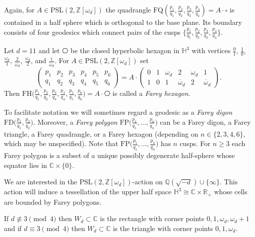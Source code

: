 \documentclass[graybox]{svmult}
\newcommand\FD{\mathrm{FD}}
\newcommand\FQ{\mathrm{FQ}}
\newcommand\FH{\mathrm{FH}}
\newcommand\FP{\mathrm{FP}}
\begin{document}
Again, for $A \in \mathrm{PSL}(2, \mathbb{Z}[\omega_d])$ the quadrangle $\FQ(\frac{p_1}{q_1},\frac{p_2}{q_2},\frac{p_3}{q_3},\frac{p_4}{q_4})=A\cdot \square$ is contained in a half sphere which is orthogonal to the base plane. Its boundary consists of four geodesics which connect pairs of the cusps $\big\{\frac{p_1}{q_1},\frac{p_2}{q_2},\frac{p_3}{q_3},\frac{p_4}{q_4}\big\}$. 

\begin{definition}
Let $d=11$ and let $\hexagon$ be the closed hyperbolic hexagon in $\mathbb{H}^3$ with vertices $\frac01$, $\frac10$, $\frac{\omega_d}1$,  $\frac2{\overline{\omega}_d}$, $\frac{\omega_d}2$,  and $\frac1{\overline{\omega}_d}$. For $A \in \mathrm{PSL}(2,\mathbb{Z}[\omega_d])$ set 
\[
\begin{pmatrix} p_1&p_2 & p_3&p_4&p_5&p_6 \\ q_1&q_2&q_3&q_4&q_5&q_6 \end{pmatrix}=A \cdot \begin{pmatrix} 0&1&\omega_d&2&\omega_d&1 \\ 1&0&1&\overline{\omega}_d&2&\overline{\omega}_d\end{pmatrix}.
\]
Then $\FH\big(\frac{p_1}{q_1},\frac{p_2}{q_2},\frac{p_3}{q_3},\frac{p_4}{q_4},\frac{p_5}{q_5},\frac{p_6}{q_6}\big)=A\cdot \hexagon$ is called a \emph{Farey hexagon}.
\end{definition}

To facilitate notation we will sometimes regard a geodesic as a {\em Farey digon} $\FD\big(\frac{p_1}{q_1},\frac{p_2}{q_2}\big)$. Moreover, a {\em Farey polygon} $\FP\big(\frac{p_1}{q_1},\ldots,\frac{p_n}{q_n}\big)$ can be a Farey digon, a Farey triangle, a Farey quadrangle, or a Farey hexagon (depending on $n\in\{2,3,4,6\}$, which may be unspecified).  Note that $\FP\big(\frac{p_1}{q_1},\ldots,\frac{p_n}{q_n}\big)$ has $n$ cusps. For $n\ge 3$ each Farey polygon is a subset of a unique possibly degenerate half-sphere whose equator lies in $\mathbb{C}\times\{0\}$. 

We are interested in the $\mathrm{PSL}(2,\mathbb{Z}[\omega_d])$-action on $\mathbb{Q}(\sqrt{-d})\cup\{\infty\}$. This action will induce a tessellation of the upper half space $\mathbb{H}^3\cong \mathbb{C}\times \mathbb{R}_+$ whose cells are bounded by Farey polygons. 

If $d\not\equiv 3 \pmod 4$ then $W_d\subset \mathbb{C}$ is the rectangle with corner points $0,1,\omega_d,\omega_d+1$ and if $d\equiv 3 \pmod 4$ then $W_d\subset \mathbb{C}$ is the triangle with corner points $0,1,\omega_d$. 
\end{document}
